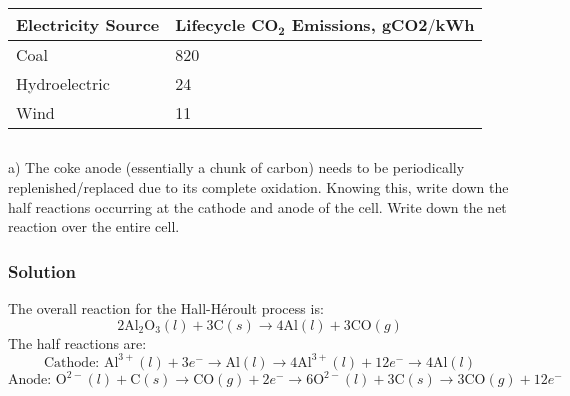 \documentclass[12pt]{article}
\begin{document}
\begin{center}
\begin{tabular}{|l|l|}
\hline
Electricity Source & Lifecycle $\mathbf{C O}_{\mathbf{2}}$ Emissions, $\mathbf{g C O} \mathbf{2} / \mathbf{k W h}$ \\
\hline
Coal & 820 \\
\hline
Hydroelectric & 24 \\
\hline
Wind & 11 \\
\hline
\end{tabular}
\end{center}

\subsection{}
a) The coke anode (essentially a chunk of carbon) needs to be periodically replenished/replaced due to its complete oxidation. Knowing this, write down the half reactions occurring at the cathode and anode of the cell. Write down the net reaction over the entire cell.\\\subsubsection{Solution}
The overall reaction for the Hall-Héroult process is:
\begin{equation}
2 \mathrm{Al}_{2} \mathrm{O}_{3}(l)+3 \mathrm{C}(s) \rightarrow 4 \mathrm{Al}(l)+3 \mathrm{CO}(g)
\end{equation}
The half reactions are:
\begin{equation}
\text{Cathode: } \mathrm{Al}^{3+}(l)+3 e^{-} \rightarrow \mathrm{Al}(l) \to 4 \mathrm{Al}^{3+}(l)+12 e^{-} \rightarrow 4 \mathrm{Al}(l)
\end{equation}
\begin{equation}
\text{Anode: } \mathrm{O}^{2-}(l) + \mathrm{C}(s) \rightarrow \mathrm{CO}(g)+2 e^{-} \to 6 \mathrm{O}^{2-}(l) + 3 \mathrm{C}(s) \rightarrow 3 \mathrm{CO}(g)+12 e^{-}
\end{equation}
\end{document}
